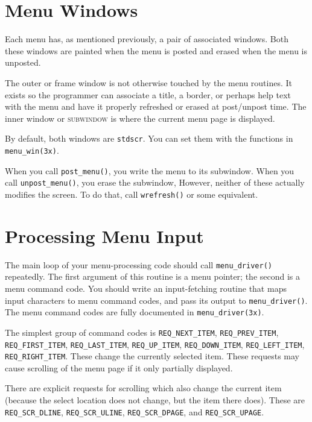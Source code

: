 \section{Menu Windows}

\label{f0:mwindows}Each menu has, as mentioned previously, a pair of associated windows.
Both these windows are painted when the menu is posted and erased when
the menu is unposted. 

The outer or frame window is not otherwise touched by the menu
routines.  It exists so the programmer can associate a title, a
border, or perhaps help text with the menu and have it properly
refreshed or erased at post/unpost time.  The inner window or
\textsc{subwindow} is where the current menu page is displayed. 

By default, both windows are \texttt{stdscr}.  You can set them with the
functions in \texttt{menu\_win(3x)}. 

When you call \texttt{post\_menu()}, you write the menu to its
subwindow.  When you call \texttt{unpost\_menu()}, you erase the
subwindow, However, neither of these actually modifies the screen.  To
do that, call \texttt{wrefresh()} or some equivalent.

\section{Processing Menu Input}

\label{f0:minput}The main loop of your menu-processing code should call
\texttt{menu\_driver()} repeatedly. The first argument of this routine
is a menu pointer; the second is a menu command code.  You should write an
input-fetching routine that maps input characters to menu command codes, and
pass its output to \texttt{menu\_driver()}.  The menu command codes are
fully documented in \texttt{menu\_driver(3x)}. 

The simplest group of command codes is \texttt{REQ\_NEXT\_ITEM},
\texttt{REQ\_PREV\_ITEM}, \texttt{REQ\_FIRST\_ITEM},
\texttt{REQ\_LAST\_ITEM}, \texttt{REQ\_UP\_ITEM},
\texttt{REQ\_DOWN\_ITEM}, \texttt{REQ\_LEFT\_ITEM},
\texttt{REQ\_RIGHT\_ITEM}.  These change the currently selected
item.  These requests may cause scrolling of the menu page if it only
partially displayed. 

There are explicit requests for scrolling which also change the
current item (because the select location does not change, but the
item there does).  These are \texttt{REQ\_SCR\_DLINE},
\texttt{REQ\_SCR\_ULINE}, \texttt{REQ\_SCR\_DPAGE}, and
\texttt{REQ\_SCR\_UPAGE}. 

